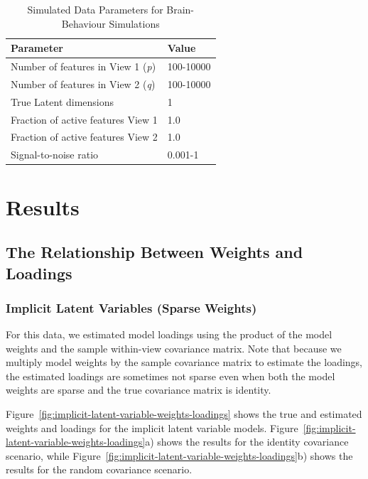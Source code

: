 \begin{table}
    \centering
    \caption{Simulated Data Parameters for Brain-Behaviour Simulations}
    \begin{tabular}{| l | l |}
        \hline
        \textbf{Parameter}                        & \textbf{Value}                               \\
        \hline
        Number of features in View 1 (\textit{p}) & 100-10000 \\
        Number of features in View 2 (\textit{q}) & 100-10000 \\
        True Latent dimensions                    & 1                                            \\
        Fraction of active features View 1            & 1.0                                          \\
        Fraction of active features View 2            & 1.0                                          \\
        Signal-to-noise ratio                    & 0.001-1 \\
        \hline
    \end{tabular}\label{tab:simulated-data-parameters-bb}
\end{table}

\section{Results}

\subsection{The Relationship Between Weights and Loadings}

\subsubsection{Implicit Latent Variables (Sparse Weights)}

For this data, we estimated model \gls{loadings} using the product of the model weights and the sample within-view covariance matrix.
Note that because we multiply model weights by the sample covariance matrix to estimate the loadings, the estimated \gls{loadings} are sometimes not sparse even when both the model weights are sparse and the true covariance matrix is identity.

Figure~\ref{fig:implicit-latent-variable-weights-loadings} shows the true and estimated \gls{weights} and \gls{loadings} for the implicit latent variable models. Figure~\ref{fig:implicit-latent-variable-weights-loadings}a) shows the results for the identity covariance scenario, while Figure~\ref{fig:implicit-latent-variable-weights-loadings}b) shows the results for the random covariance scenario.

